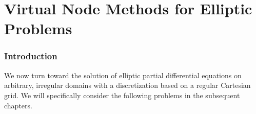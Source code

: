 %

\part{Virtual Node Methods for Elliptic Problems}

\section*{Introduction}

We now turn toward the solution of elliptic partial differential equations on arbitrary, irregular domains with a discretization based on a regular Cartesian grid. We will specifically consider the following problems in the subsequent chapters.

